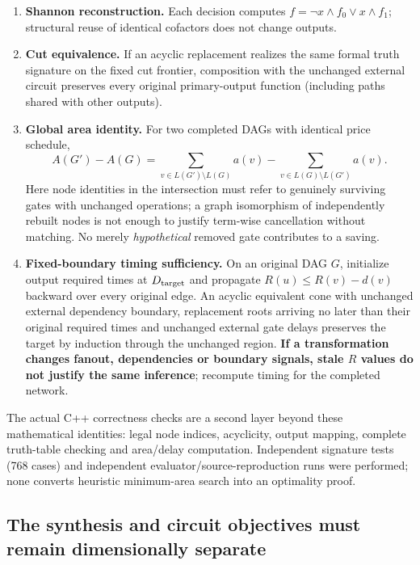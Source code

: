 \begin{enumerate}
\def\labelenumi{\arabic{enumi}.}
\tightlist
\item
  \textbf{Shannon reconstruction.} Each decision computes \(f=\neg x\land f_0\lor x\land f_1\); structural reuse of identical cofactors does not change outputs.
\item
  \textbf{Cut equivalence.} If an acyclic replacement realizes the same formal truth signature on the fixed cut frontier, composition with the unchanged external circuit preserves every original primary-output function (including paths shared with other outputs).
\item
  \textbf{Global area identity.} For two completed DAGs with identical price schedule, \[
  A(G')-A(G)=\sum_{v\in L(G')\setminus L(G)}a(v)
      -\sum_{v\in L(G)\setminus L(G')}a(v).
  \] Here node identities in the intersection must refer to genuinely surviving gates with unchanged operations; a graph isomorphism of independently rebuilt nodes is not enough to justify term-wise cancellation without matching. No merely \emph{hypothetical} removed gate contributes to a saving.
\item
  \textbf{Fixed-boundary timing sufficiency.} On an original DAG \(G\), initialize output required times at \(D_{\rm target}\) and propagate \(R(u)\le R(v)-d(v)\) backward over every original edge. An acyclic equivalent cone with unchanged external dependency boundary, replacement roots arriving no later than their original required times and unchanged external gate delays preserves the target by induction through the unchanged region. \textbf{If a transformation changes fanout, dependencies or boundary signals, stale \(R\) values do not justify the same inference}; recompute timing for the completed network.
\end{enumerate}

The actual C++ correctness checks are a second layer beyond these mathematical identities: legal node indices, acyclicity, output mapping, complete truth-table checking and area/delay computation. Independent signature tests (768 cases) and independent evaluator/source-reproduction runs were performed; none converts heuristic minimum-area search into an optimality proof.

\subsection{The synthesis and circuit objectives must remain dimensionally separate}\label{the-synthesis-and-circuit-objectives-must-remain-dimensionally-separate}

